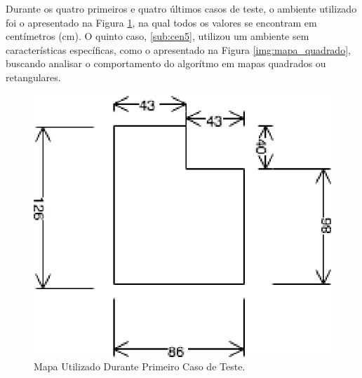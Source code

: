 Durante os quatro primeiros e quatro últimos casos de teste, o ambiente utilizado foi o apresentado na Figura \ref{img:map1}, na qual todos os
valores se encontram em centímetros (cm). O quinto caso, \ref{sub:cen5}, utilizou um ambiente sem características específicas, como o apresentado
na Figura \ref{img:mapa_quadrado}, buscando analisar o comportamento do algorítmo em mapas quadrados ou retangulares.

\begin{figure}[H]
	\centering
	\includegraphics[scale=1.3]{figuras/map1.eps}
	\caption[Primeiro Caso de Teste]{Mapa Utilizado Durante Primeiro Caso de Teste.}
	\label{img:map1}
\end{figure}

